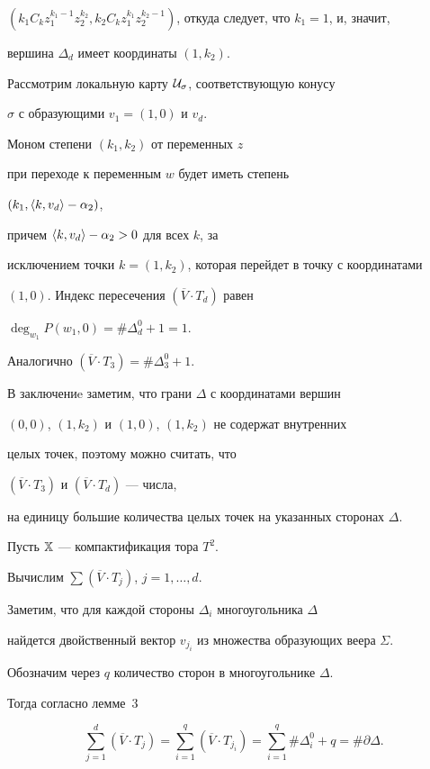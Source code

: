 \begin{pf}
$\left (k_1 C_k z_1^{k_1-1} z_2^{k_2} , k_2 C_k z_1^{k_1} z_2^{k_2-1}


\right )$, откуда следует, что $k_1=1$, и, значит,


вершина $\Delta_d$ имеет координаты $(1,k_2)$.


Рассмотрим локальную карту $\cal U_{\sigma}$, соответствующую конусу


$\sigma$ с образующими $v_1=(1,0)$ и $v_d$.


Моном степени $(k_1,k_2)$ от переменных $z$


при переходе к переменным $w$ будет иметь степень


$(k_1,\langle k,v_d\rangle-\alpha_2)$,


причем $\langle k,v_d\rangle-\alpha_2>0$ для всех $k$, за


исключением точки $k=(1,k_2)$, которая перейдет в точку с координатами


$(1,0)$. Индекс пересечения $(\overline V\cdot T_{d})$ равен


$\deg_{w_1}P(w_1,0)=\#\Delta^0_d+1=1$.


Аналогично $(\overline V\cdot T_{3})=\#\Delta^0_3+1$.





В заключениe заметим, что грани $\Delta$ с координатами вершин


$(0,0)$, $(1,k_2)$ и $(1,0)$, $(1,k_2)$ не содержат внутренних


целых точек, поэтому можно считать, что


$(\overline V\cdot T_{3})$ и $(\overline V\cdot T_{d})$ --- числа,


на единицу большие количества целых точек на указанных сторонах $\Delta$.


\end{pf}





Пусть $\Bbb X$ --- компактификация тора $T^2$.


Вычислим $\sum (\overline{V}\cdot T_j)$, $j=1,\dotsc, d$.


Заметим, что для каждой стороны $\Delta_i$ многоугольника $\Delta$


найдется двойственный вектор $v_{j_i}$ из множества образующих веера $\Sigma$.


Обозначим через $q$ количество сторон в многоугольнике $\Delta$.


Тогда  согласно лемме~3


\begin{equation}


\label{f1}


\sum\limits_{j=1}^d (\overline{V}\cdot T_j)


= \sum\limits_{i=1}^q (\overline V\cdot T_{j_i}) =


\sum\limits_{i=1}^q \#\Delta_i^0 + q = \#\partial\Delta.


\end{equation}





